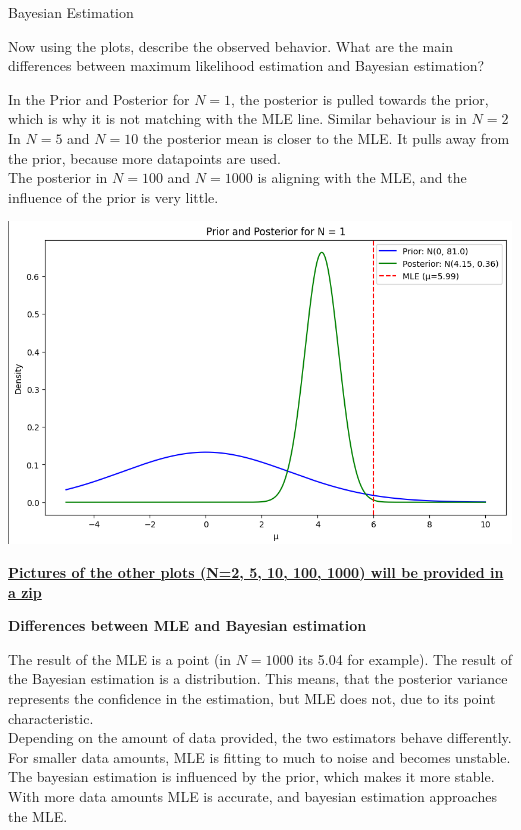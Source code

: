 \documentclass[
	english,
        solution=true
	]{tudaexercise}
\begin{document}
\begin{task}[points=16]{Bayesian Estimation}
\begin{subtask}[points=12]
    Now using the plots, describe the observed behavior. What are the main differences between maximum likelihood estimation and Bayesian estimation?
\end{subtask}

\begin{solution}

In the Prior and Posterior for $N=1$, the posterior is pulled towards the prior, which is why it is not matching with the MLE line. Similar behaviour is in $N=2$\\
In $N=5$ and $N=10$ the posterior mean is closer to the MLE. It pulls away from the prior, because more datapoints are used.\\
The posterior in $N=100$ and $N=1000$ is aligning with the MLE, and the influence of the prior is very little.\\

\begin{center}
    \includegraphics[width=0.75\linewidth]{priorAndPosteriorN1.png}
\end{center}

\underline{\textbf{Pictures of the other plots (N=2, 5, 10, 100, 1000) will be provided in a zip}}

\textbf{Differences between MLE and Bayesian estimation}

The result of the MLE is a point (in $N=1000$ its 5.04 for example). The result of the Bayesian estimation is a distribution. This means, that the posterior variance represents the confidence in the estimation, but MLE does not, due to its point characteristic. \\

Depending on the amount of data provided, the two estimators behave differently. For smaller data amounts, MLE is fitting to much to noise and becomes unstable. The bayesian estimation is influenced by the prior, which makes it more stable. With more data amounts MLE is accurate, and bayesian estimation approaches the MLE.



\end{solution}
\end{task}
\end{document}
